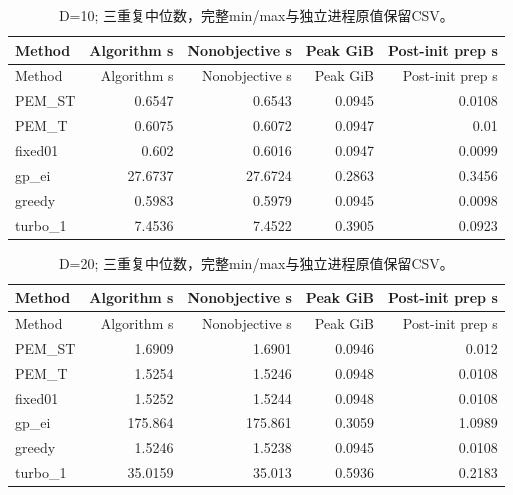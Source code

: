 \documentclass[11pt,a4paper]{article}
\begin{document}
\par\noindent\begin{minipage}{\linewidth}

\begin{longtable}[]{@{}lrrrr@{}}
\caption{D=10;
三重复中位数，完整min/max与独立进程原值保留CSV。}\tabularnewline
\toprule
Method & Algorithm s & Nonobjective s & Peak GiB & Post-init prep s \\
\midrule
\endfirsthead
\toprule
Method & Algorithm s & Nonobjective s & Peak GiB & Post-init prep s \\
\midrule
\endhead
PEM\_ST & 0.6547 & 0.6543 & 0.0945 & 0.0108 \\
PEM\_T & 0.6075 & 0.6072 & 0.0947 & 0.01 \\
fixed01 & 0.602 & 0.6016 & 0.0947 & 0.0099 \\
gp\_ei & 27.6737 & 27.6724 & 0.2863 & 0.3456 \\
greedy & 0.5983 & 0.5979 & 0.0945 & 0.0098 \\
turbo\_1 & 7.4536 & 7.4522 & 0.3905 & 0.0923 \\
\bottomrule
\end{longtable}

\end{minipage}\par

\par\noindent\begin{minipage}{\linewidth}

\begin{longtable}[]{@{}lrrrr@{}}
\caption{D=20;
三重复中位数，完整min/max与独立进程原值保留CSV。}\tabularnewline
\toprule
Method & Algorithm s & Nonobjective s & Peak GiB & Post-init prep s \\
\midrule
\endfirsthead
\toprule
Method & Algorithm s & Nonobjective s & Peak GiB & Post-init prep s \\
\midrule
\endhead
PEM\_ST & 1.6909 & 1.6901 & 0.0946 & 0.012 \\
PEM\_T & 1.5254 & 1.5246 & 0.0948 & 0.0108 \\
fixed01 & 1.5252 & 1.5244 & 0.0948 & 0.0108 \\
gp\_ei & 175.864 & 175.861 & 0.3059 & 1.0989 \\
greedy & 1.5246 & 1.5238 & 0.0945 & 0.0108 \\
turbo\_1 & 35.0159 & 35.013 & 0.5936 & 0.2183 \\
\bottomrule
\end{longtable}

\end{minipage}\par
\end{document}
